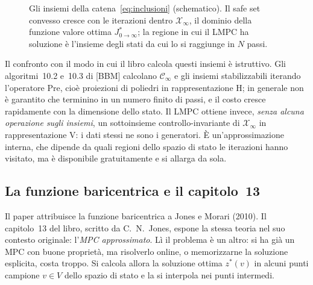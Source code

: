 \documentclass[11pt,a4paper]{article}
\theoremstyle{definition}
\theoremstyle{plain}
\theoremstyle{remark}
\newcommand{\Xc}{\mathcal{X}}
\newcommand{\CS}{\mathcal{CS}}
\newcommand{\Jstar}{J^{*}_{0\to\infty}}
\begin{document}
\begin{figure}[h]
\centering
{}
\caption{Gli insiemi della catena~\eqref{eq:inclusioni} (schematico). Il
safe set convesso cresce con le iterazioni dentro $\Xc_\infty$, il dominio
della funzione valore ottima $\Jstar$; la regione in cui il LMPC ha soluzione è l'insieme degli stati
da cui lo si raggiunge in $N$ passi.}
\label{fig:inclusioni}
\end{figure}

Il confronto con il modo in cui il libro calcola questi insiemi è istruttivo.
Gli algoritmi~10.2 e~10.3 di [BBM] calcolano $\mathcal{C}_\infty$ e gli insiemi
stabilizzabili iterando l'operatore $\mathrm{Pre}$, cioè proiezioni di poliedri
in rappresentazione H; in generale non è garantito che terminino in un numero
finito di passi, e il costo cresce rapidamente con la dimensione dello stato.
Il LMPC ottiene invece, \emph{senza alcuna operazione sugli insiemi}, un
sottoinsieme controllo-invariante di $\Xc_\infty$ in rappresentazione V: i
dati stessi ne sono i generatori. È un'approssimazione interna, che dipende
da quali regioni dello spazio di stato le iterazioni hanno visitato, ma è
disponibile gratuitamente e si allarga da sola.

\subsection{La funzione baricentrica e il capitolo~13}\label{sec:libro-baricentrica}

Il paper attribuisce la funzione baricentrica a Jones e Morari (2010). Il
capitolo~13 del libro, scritto da C.~N.~Jones, espone la stessa teoria nel suo
contesto originale: l'\emph{MPC approssimato}. Lì il problema è un altro: si ha
già un MPC con buone proprietà, ma risolverlo online, o memorizzarne la
soluzione esplicita, costa troppo. Si calcola allora la soluzione ottima
$z^*(v)$ in alcuni punti campione $v\in V$ dello spazio di stato e la si
interpola nei punti intermedi.
\end{document}

